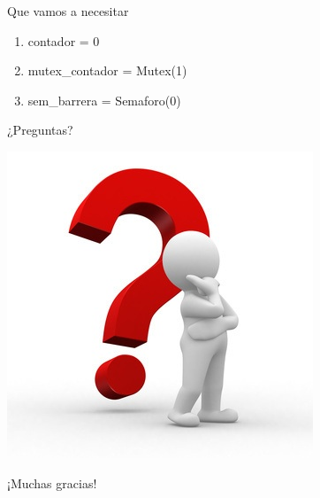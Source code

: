 \documentclass[pdf]{beamer}
\begin{document}
\begin{frame}{Que vamos a necesitar}
    \begin{enumerate}
        \item contador = 0
        \item mutex\_contador = Mutex(1)
        \item sem\_barrera = Semaforo(0)
    \end{enumerate}
\end{frame}


\begin{frame}
    \huge{¿Preguntas?}
    \begin{center}
        \includegraphics[scale=0.4]{img/question-mark.jpg}
    \end{center}
    \large{¡Muchas gracias!}
\end{frame}
\end{document}

